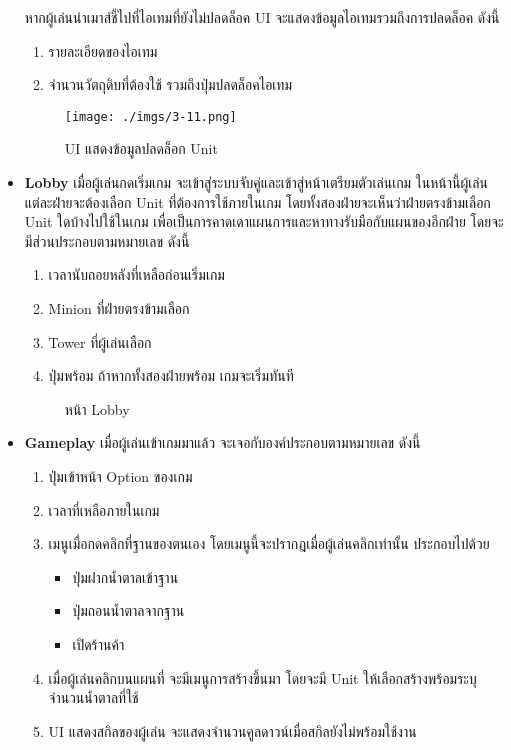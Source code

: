 \documentclass[12pt,oneside,openright,a4paper]{cpe-thai-project}
\begin{document}
\begin{itemize}
  หากผู้เล่นนำเมาส์ชี้ไปที่ไอเทมที่ยังไม่ปลดล็อค UI 
  จะแสดงข้อมูลไอเทมรวมถึงการปลดล็อค ดังนี้
  \begin{enumerate}
    \item รายละเอียดของไอเทม
    \item จำนวนวัตถุดิบที่ต้องใช้ รวมถึงปุ่มปลดล็อคไอเทม
  \end{enumerate}

  \begin{figure}[H]\centering
    \texttt{[image: ./imgs/3-11.png]}
    \caption{UI แสดงข้อมูลปลดล็อก Unit}\label{fig:3-11}
  \end{figure}

  \pagebreak
  \item \textbf{Lobby} เมื่อผู้เล่นกดเริ่มเกม จะเข้าสู่ระบบจับคู่และเข้าสู่หน้าเตรียมตัวเล่นเกม 
  ในหน้านี้ผู้เล่นแต่ละฝ่ายจะต้องเลือก Unit ที่ต้องการใช้ภายในเกม 
  โดยทั้งสองฝ่ายจะเห็นว่าฝ่ายตรงข้ามเลือก Unit ใดบ้างไปใช้ในเกม 
  เพื่อเป็นการคาดเดาแผนการและหาทางรับมือกับแผนของอีกฝ่าย โดยจะมีส่วนประกอบตามหมายเลข ดังนี้
  \begin{enumerate}
    \item เวลานับถอยหลังที่เหลือก่อนเริ่มเกม
    \item Minion ที่ฝ่ายตรงข้ามเลือก
    \item Tower ที่ผู้เล่นเลือก
    \item ปุ่มพร้อม ถ้าหากทั้งสองฝ่ายพร้อม เกมจะเริ่มทันที
  \end{enumerate}

  \begin{figure}[H]\centering
    \setlength{\fboxsep}{0cm}
    \caption{หน้า Lobby}\label{fig:3-12}
  \end{figure}
  
  \item \textbf{Gameplay} เมื่อผู้เล่นเข้าเกมมาแล้ว จะเจอกับองค์ประกอบตามหมายเลข ดังนี้
  \begin{enumerate}
    \item ปุ่มเข้าหน้า Option ของเกม
    \item เวลาที่เหลือภายในเกม
    \item เมนูเมื่อกดคลิกที่ฐานของตนเอง โดยเมนูนี้จะปรากฎเมื่อผู้เล่นคลิกเท่านั้น ประกอบไปด้วย
    \begin{itemize}
      \item ปุ่มฝากน้ำตาลเข้าฐาน
      \item ปุ่มถอนน้ำตาลจากฐาน
      \item เปิดร้านค้า
    \end{itemize}
    \item เมื่อผู้เล่นคลิกบนแผนที่ จะมีเมนูการสร้างขึ้นมา 
    โดยจะมี Unit ให้เลือกสร้างพร้อมระบุจำนวนน้ำตาลที่ใช้
    \item UI แสดงสกิลของผู้เล่น จะแสดงจำนวนคูลดาวน์เมื่อสกิลยังไม่พร้อมใช้งาน
  \end{enumerate}


\end{itemize}
\end{document}
